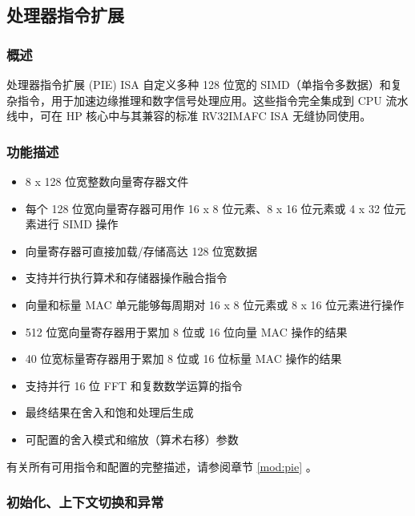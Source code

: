 \documentclass[main\_\_CN.tex]{subfiles}
\begin{document}

\newpage
\subsection{处理器指令扩展}
\label{sec:riscvcpu-pie}

\subsubsection{概述}
\label{sec:riscvcpu-pie-overview}

处理器指令扩展 (PIE) ISA 自定义多种 128 位宽的 SIMD（单指令多数据）和复杂指令，用于加速边缘推理和数字信号处理应用。这些指令完全集成到 CPU 流水线中，可在 HP 核心中与其兼容的标准 RV32IMAFC ISA 无缝协同使用。

\subsubsection{功能描述}

\label{sec:riscvcpu-pie-func-descr}
\begin{itemize}
    \item 8 x 128 位宽整数向量寄存器文件
    \item 每个 128 位宽向量寄存器可用作 16 x 8 位元素、8 x 16 位元素或 4 x 32 位元素进行 SIMD 操作
    \item 向量寄存器可直接加载/存储高达 128 位宽数据
    \item 支持并行执行算术和存储器操作融合指令
    \item 向量和标量 MAC 单元能够每周期对 16 x 8 位元素或 8 x 16 位元素进行操作
    \item 512 位宽向量寄存器用于累加 8 位或 16 位向量 MAC 操作的结果
    \item 40 位宽标量寄存器用于累加 8 位或 16 位标量 MAC 操作的结果
    \item 支持并行 16 位 FFT 和复数数学运算的指令
    \item 最终结果在舍入和饱和处理后生成
    \item 可配置的舍入模式和缩放（算术右移）参数
\end{itemize}

有关所有可用指令和配置的完整描述，请参阅章节 \ref{mod:pie} \textit{}。

\subsubsection{初始化、上下文切换和异常}
\label{sec:riscvcpu-pie-init}
\end{document}
